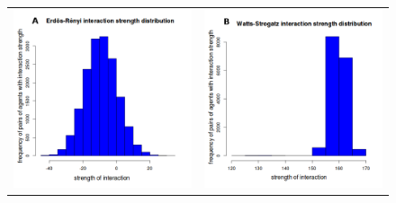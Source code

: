 \documentclass[11pt]{article}
\begin{document}
\begin{figure} [h!]
\centering
\begin{tabular}{cc}

\includegraphics[scale=0.28]{images/erdos_trust.png} & 
\includegraphics[scale=0.28]{images/watts_trust.png} \\

\end{tabular}
\end{figure}
\end{document}
